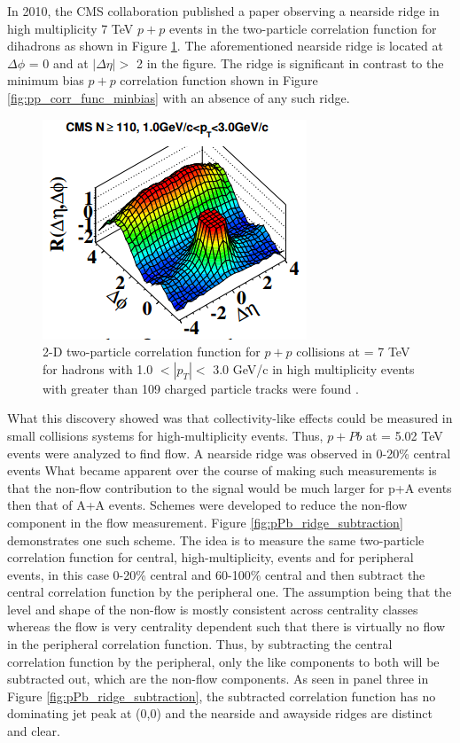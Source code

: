 In 2010, the CMS collaboration published a paper observing a nearside ridge in high multiplicity 7 TeV $p+p$ events in the two-particle correlation function for dihadrons as shown in Figure \ref{fig:pp_ridge_plot}. The aforementioned nearside ridge is located at $\Delta\phi$ = 0 and at $|\Delta\eta| > $ 2 in the figure. The ridge is significant in contrast to the minimum bias $p+p$ correlation function shown in Figure \ref{fig:pp_corr_func_minbias} with an absence of any such ridge.
\begin{figure}[h!]
\begin{center}
\includegraphics[width=0.55\linewidth]{figs/pp_high_multiplicity_ridge.PNG}
\caption{ 2-D two-particle correlation function for $p+p$ collisions at \sqsn = 7 TeV for hadrons with 1.0 $<|p_T|<$ 3.0 GeV/c in high multiplicity events with greater than 109 charged particle tracks were found \cite{Khachatryan2010}.}
\label{fig:pp_ridge_plot}
\end{center}
\end{figure}

What this discovery showed was that collectivity-like effects could be measured in small collisions systems for high-multiplicity events. Thus, $p+Pb$ at \sqsn = 5.02 TeV events were analyzed to find flow. A nearside ridge was observed in 0-20\% central events What became apparent over the course of making such measurements is that the non-flow contribution to the signal would be much larger for p+A events then that of A+A events. Schemes were developed to reduce the non-flow component in the flow measurement. Figure \ref{fig:pPb_ridge_subtraction} demonstrates one such scheme. The idea is to measure the same two-particle correlation function for central, high-multiplicity, events and for peripheral events, in this case 0-20\% central and 60-100\% central and then subtract the central correlation function by the peripheral one. The assumption being that the level and shape of the non-flow is mostly consistent across centrality classes whereas the flow is very centrality dependent such that there is virtually no flow in the peripheral correlation function. Thus, by subtracting the central correlation function by the peripheral, only the like components to both will be subtracted out, which are the non-flow components. As seen in panel three in Figure \ref{fig:pPb_ridge_subtraction}, the subtracted correlation function has no dominating jet peak at (0,0) and the nearside and awayside ridges are distinct and clear.

